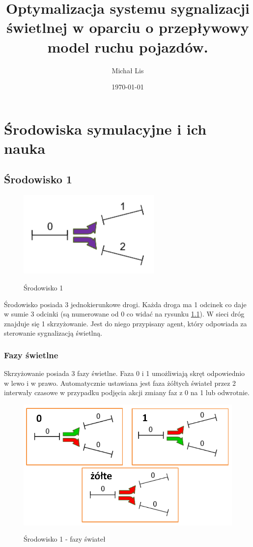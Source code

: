 \documentclass[12pt]{book}
\theoremstyle{plain}
\begin{document}
	\title{Optymalizacja  systemu sygnalizacji świetlnej w 
		oparciu o przepływowy model ruchu pojazdów.}
	\author{Michał Lis}
	\date{\today}
	\maketitle
	\tableofcontents
	
	\chapter {Środowiska symulacyjne i ich nauka}
	\section{Środowisko 1}
	\begin{figure}[H]
		\centering
		\includegraphics[width=7cm]{images/env_1}
		\label{fig:env_1}
		\caption{Środowisko 1}
	\end{figure}
	
	Środowisko posiada 3 jednokierunkowe drogi. Każda droga ma 1 odcinek co daje w sumie 3 odcinki (są numerowane od 0 co widać na rysunku \ref{fig:env_1}).
	W sieci dróg znajduje się 1 skrzyżowanie. Jest do niego przypisany agent, który odpowiada za sterowanie sygnalizacją świetlną. 
	
	\subsection{Fazy świetlne}
	Skrzyżowanie posiada 3 fazy świetlne. Faza 0 i 1 umożliwiają skręt odpowiednio w lewo i w prawo. Automatycznie ustawiana jest faza żółtych świateł przez 2 interwały czasowe w przypadku podjęcia akcji zmiany faz z 0 na 1 lub odwrotnie. 
	
	\begin{figure}[H]
		\centering
		\includegraphics[width=14cm]{images/env_1_fazy}
		\label{fig:env_1_fazy}
		\caption{Środowisko 1 - fazy świateł}
	\end{figure}
	
\end{document}
